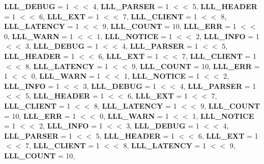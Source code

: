 \begin{DoxyCompactItemize}
{\bfseries L\+L\+L\+\_\+\+D\+E\+B\+UG} = 1 $<$$<$ 4, 
\newline
{\bfseries L\+L\+L\+\_\+\+P\+A\+R\+S\+ER} = 1 $<$$<$ 5, 
{\bfseries L\+L\+L\+\_\+\+H\+E\+A\+D\+ER} = 1 $<$$<$ 6, 
{\bfseries L\+L\+L\+\_\+\+E\+XT} = 1 $<$$<$ 7, 
{\bfseries L\+L\+L\+\_\+\+C\+L\+I\+E\+NT} = 1 $<$$<$ 8, 
\newline
{\bfseries L\+L\+L\+\_\+\+L\+A\+T\+E\+N\+CY} = 1 $<$$<$ 9, 
{\bfseries L\+L\+L\+\_\+\+C\+O\+U\+NT} = 10, 
{\bfseries L\+L\+L\+\_\+\+E\+RR} = 1 $<$$<$ 0, 
{\bfseries L\+L\+L\+\_\+\+W\+A\+RN} = 1 $<$$<$ 1, 
\newline
{\bfseries L\+L\+L\+\_\+\+N\+O\+T\+I\+CE} = 1 $<$$<$ 2, 
{\bfseries L\+L\+L\+\_\+\+I\+N\+FO} = 1 $<$$<$ 3, 
{\bfseries L\+L\+L\+\_\+\+D\+E\+B\+UG} = 1 $<$$<$ 4, 
{\bfseries L\+L\+L\+\_\+\+P\+A\+R\+S\+ER} = 1 $<$$<$ 5, 
\newline
{\bfseries L\+L\+L\+\_\+\+H\+E\+A\+D\+ER} = 1 $<$$<$ 6, 
{\bfseries L\+L\+L\+\_\+\+E\+XT} = 1 $<$$<$ 7, 
{\bfseries L\+L\+L\+\_\+\+C\+L\+I\+E\+NT} = 1 $<$$<$ 8, 
{\bfseries L\+L\+L\+\_\+\+L\+A\+T\+E\+N\+CY} = 1 $<$$<$ 9, 
\newline
{\bfseries L\+L\+L\+\_\+\+C\+O\+U\+NT} = 10, 
{\bfseries L\+L\+L\+\_\+\+E\+RR} = 1 $<$$<$ 0, 
{\bfseries L\+L\+L\+\_\+\+W\+A\+RN} = 1 $<$$<$ 1, 
{\bfseries L\+L\+L\+\_\+\+N\+O\+T\+I\+CE} = 1 $<$$<$ 2, 
\newline
{\bfseries L\+L\+L\+\_\+\+I\+N\+FO} = 1 $<$$<$ 3, 
{\bfseries L\+L\+L\+\_\+\+D\+E\+B\+UG} = 1 $<$$<$ 4, 
{\bfseries L\+L\+L\+\_\+\+P\+A\+R\+S\+ER} = 1 $<$$<$ 5, 
{\bfseries L\+L\+L\+\_\+\+H\+E\+A\+D\+ER} = 1 $<$$<$ 6, 
\newline
{\bfseries L\+L\+L\+\_\+\+E\+XT} = 1 $<$$<$ 7, 
{\bfseries L\+L\+L\+\_\+\+C\+L\+I\+E\+NT} = 1 $<$$<$ 8, 
{\bfseries L\+L\+L\+\_\+\+L\+A\+T\+E\+N\+CY} = 1 $<$$<$ 9, 
{\bfseries L\+L\+L\+\_\+\+C\+O\+U\+NT} = 10, 
\newline
{\bfseries L\+L\+L\+\_\+\+E\+RR} = 1 $<$$<$ 0, 
{\bfseries L\+L\+L\+\_\+\+W\+A\+RN} = 1 $<$$<$ 1, 
{\bfseries L\+L\+L\+\_\+\+N\+O\+T\+I\+CE} = 1 $<$$<$ 2, 
{\bfseries L\+L\+L\+\_\+\+I\+N\+FO} = 1 $<$$<$ 3, 
\newline
{\bfseries L\+L\+L\+\_\+\+D\+E\+B\+UG} = 1 $<$$<$ 4, 
{\bfseries L\+L\+L\+\_\+\+P\+A\+R\+S\+ER} = 1 $<$$<$ 5, 
{\bfseries L\+L\+L\+\_\+\+H\+E\+A\+D\+ER} = 1 $<$$<$ 6, 
{\bfseries L\+L\+L\+\_\+\+E\+XT} = 1 $<$$<$ 7, 
\newline
{\bfseries L\+L\+L\+\_\+\+C\+L\+I\+E\+NT} = 1 $<$$<$ 8, 
{\bfseries L\+L\+L\+\_\+\+L\+A\+T\+E\+N\+CY} = 1 $<$$<$ 9, 
{\bfseries L\+L\+L\+\_\+\+C\+O\+U\+NT} = 10, 

\end{DoxyCompactItemize}
